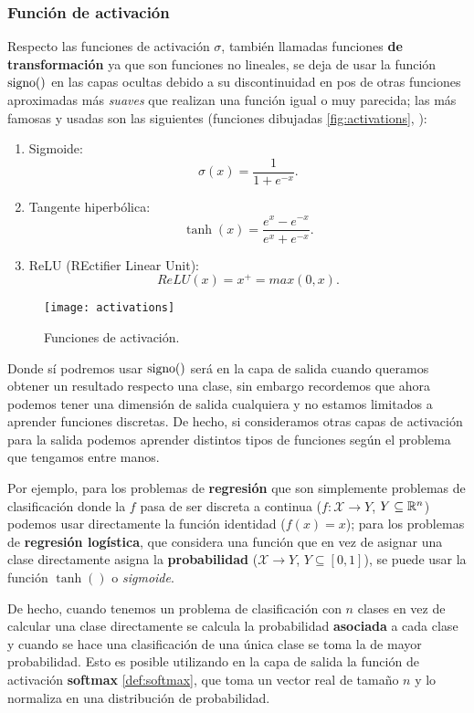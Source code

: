 \subsubsection{Función de activación}

Respecto las funciones de activación $\sigma$, también llamadas funciones \textbf{de transformación} ya que son funciones no lineales, se deja de usar la función $\operatorname{signo}()$ en las capas ocultas debido a su discontinuidad en pos de otras funciones aproximadas más \emph{suaves} que realizan una función igual o muy parecida; las más famosas y usadas son las siguientes (funciones dibujadas \autoref{fig:activations}, \cite{moujahid2016activations}):

\begin{enumerate}
  \item Sigmoide: $$\sigma(x) = \dfrac{1}{1 + e^{-x}}.$$
  \item Tangente hiperbólica: $$\tanh(x) = \dfrac{e^x-e^{-x}}{e^{x}+e^{-x}}.$$
  \item ReLU (REctifier Linear Unit): $$ReLU(x) = x^+ = max(0, x).$$
\end{enumerate}

\begin{figure}[htpb]
  \centering
  \texttt{[image: activations]}
  \caption{Funciones de activación.}
  \label{fig:activations}
\end{figure}

Donde sí podremos usar $\operatorname{signo}()$ será en la capa de salida cuando queramos obtener un resultado respecto una clase, sin embargo recordemos que ahora podemos tener una dimensión de salida cualquiera y no estamos limitados a aprender funciones discretas. De hecho, si consideramos otras capas de activación para la salida podemos aprender distintos tipos de funciones según el problema que tengamos entre manos.

Por ejemplo, para los problemas de \textbf{regresión} que son simplemente problemas de clasificación donde la $f$ pasa de ser discreta a continua ($f: \mathcal{X} \to Y$, $Y \subseteq \mathbb{R}^n$) podemos usar directamente la función identidad ($f(x) = x$); para los problemas de \textbf{regresión logística}, que considera una función que en vez de asignar una clase directamente asigna la \textbf{probabilidad} ($\mathcal{X} \to Y$, $Y \subseteq [0, 1]$), se puede usar la función $\tanh()$ o \emph{sigmoide}.

De hecho, cuando tenemos un problema de clasificación con $n$ clases en vez de calcular una clase directamente se calcula la probabilidad \textbf{asociada} a cada clase y cuando se hace una clasificación de una única clase se toma la de mayor probabilidad. Esto es posible utilizando en la capa de salida la función de activación \textbf{softmax} \autoref{def:softmax}, que toma un vector real de tamaño $n$ y lo normaliza en una distribución de probabilidad.

